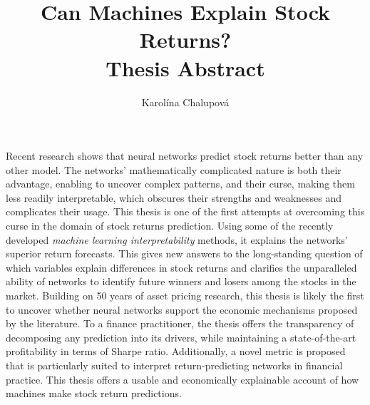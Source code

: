 \documentclass[12pt]{article}
\begin{document}
\title{%
	Can Machines Explain Stock Returns? \\
	\large Thesis Abstract}
\author{Karolína Chalupová}
\maketitle

Recent research shows that neural networks predict stock returns better than any other model. The networks' mathematically complicated nature is both their advantage, enabling to uncover complex patterns, and their curse, making them less readily interpretable, which obscures their strengths and weaknesses and complicates their usage. This thesis is one of the first attempts at overcoming this curse in the domain of stock returns prediction. Using some of the recently developed \textit{machine learning interpretability} methods, it explains the networks' superior return forecasts. This gives new answers to the long-standing question of which variables explain differences in stock returns and clarifies the unparalleled ability of networks to identify future winners and losers among the stocks in the market. Building on 50 years of asset pricing research, this thesis is likely the first to uncover whether neural networks support the economic mechanisms proposed by the literature. To a finance practitioner, the thesis offers the transparency of decomposing any prediction into its drivers, while maintaining a state-of-the-art profitability in terms of Sharpe ratio. Additionally, a novel metric is proposed that is particularly suited to interpret return-predicting networks in financial practice. This thesis offers a usable and economically explainable account of how machines make stock return predictions.	

 
\end{document}
